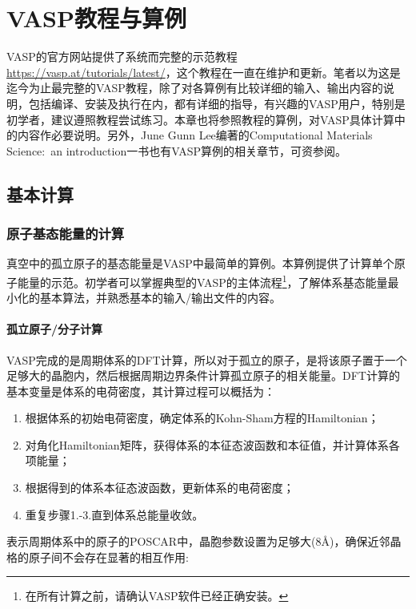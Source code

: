 \chapter{\rm{VASP}教程与算例}
\textrm{VASP}的官方网站提供了系统而完整的示范教程%
\url{https://vasp.at/tutorials/latest/}，这个教程在一直在维护和更新。笔者以为这是迄今为止最完整的\textrm{VASP}教程，除了对各算例有比较详细的输入、输出内容的说明，包括编译、安装及执行在内，都有详细的指导，有兴趣的\textrm{VASP}用户，特别是初学者，建议遵照教程尝试练习。本章也将参照教程的算例，对\textrm{VASP}具体计算中的内容作必要说明。另外，\textrm{June Gunn Lee}编著的\textrm{Computational Materials Science:~an introduction}\cite{J.-G._Lee}一书也有\textrm{VASP}算例的相关章节，可资参阅。
\section{基本计算}
\subsection{原子基态能量的计算}\label{Sec:atom-O}
真空中的孤立原子的基态能量是\textrm{VASP}中最简单的算例。本算例提供了计算单个原子能量的示范。初学者可以掌握典型的\textrm{VASP}的主体流程\footnote{在所有计算之前，请确认\textrm{VASP}软件已经正确安装。}，了解体系基态能量最小化的基本算法，并熟悉基本的输入/输出文件的内容。

\subsubsection{孤立原子/分子计算}\label{Sec:atom-O-1}
\textrm{VASP}完成的是周期体系的\textrm{DFT}计算，所以对于孤立的原子，是将该原子置于一个足够大的晶胞内，然后根据周期边界条件计算孤立原子的相关能量。\textrm{DFT}计算的基本变量是体系的电荷密度，其计算过程可以概括为：
\begin{enumerate}
	\item 根据体系的初始电荷密度，确定体系的\textrm{Kohn-Sham}方程的\textrm{Hamiltonian}；
	\item 对角化\textrm{Hamiltonian}矩阵，获得体系的本征态波函数和本征值，并计算体系各项能量；
	\item 根据得到的体系本征态波函数，更新体系的电荷密度；
	\item 重复步骤\textrm{1.-3.}直到体系总能量收敛。
\end{enumerate}

表示周期体系中的原子的\textrm{POSCAR}中，晶胞参数设置为足够大(8\AA)，确保近邻晶格的原子间不会存在显著的相互作用:
{\fontsize{8.2pt}{6.2pt}\selectfont{
}}

